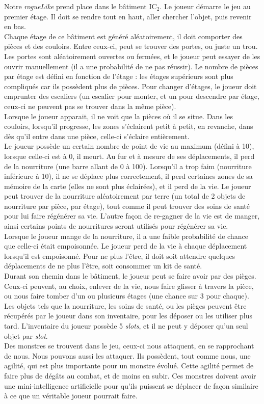 \documentclass[11pt]{report}
\begin{document}
	Notre \emph{rogueLike} prend place dans le bâtiment IC$_2$. Le joueur démarre le jeu au premier étage. Il doit se rendre tout en haut, aller chercher l'objet, puis revenir en bas.\\
	Chaque étage de ce bâtiment est généré aléatoirement, il doit comporter des pièces et des couloirs. Entre ceux-ci, peut se trouver des portes, ou juste un trou. Les portes sont aléatoirement ouvertes ou fermées, et le joueur peut essayer de les ouvrir manuellement (il a une probabilité de ne pas réussir). Le nombre de pièces par étage est défini en fonction de l'étage : les étages supérieurs sont plus compliqués car ils possèdent plus de pièces. Pour changer d'étages, le joueur doit emprunter des escaliers (un escalier pour monter, et un pour descendre par étage, ceux-ci ne peuvent pas se trouver dans la même pièce).\\
	Lorsque le joueur apparait, il ne voit que la pièces où il se situe. Dans les couloirs, lorsqu'il progresse, les zones s'éclairent petit à petit, en revanche, dans dès qu'il entre dans une pièce, celle-ci s'éclaire entièrement.\\
	Le joueur possède un certain nombre de point de vie au maximum (défini à 10), lorsque celle-ci est à 0, il meurt. Au fur et à mesure de ses déplacements, il perd de la nourriture (une barre allant de 0 à 100). Lorsqu'il a trop faim (nourriture inférieure à 10), il ne se déplace plus correctement, il perd certaines zones de sa mémoire de la carte (elles ne sont plus éclairées), et il perd de la vie. Le joueur peut trouver de la nourriture aléatoirement par terre (un total de 2 objets de nourriture par pièce, par étage), tout comme il peut trouver des soins de santé pour lui faire régénérer sa vie. L'autre façon de re-gagner de la vie est de manger, ainsi certains points de nourritures seront utilisés pour régénérer sa vie.\\
	Lorsque le joueur mange de la nourriture, il a une faible probabilité de chance que celle-ci était empoisonnée. Le joueur perd de la vie à chaque déplacement lorsqu'il est empoisonné. Pour ne plus l'être, il doit soit attendre quelques déplacements de ne plus l'être, soit consommer un kit de santé.\\
	Durant son chemin dans le bâtiment, le joueur peut se faire avoir par des pièges. Ceux-ci peuvent, au choix, enlever de la vie, nous faire glisser à travers la pièce, ou nous faire tomber d'un ou plusieurs étages (une chance sur 3 pour chaque).\\
	Les objets tels que la nourriture, les soins de santé, ou les pièges peuvent être récupérés par le joueur dans son inventaire, pour les déposer ou les utiliser plus tard. L'inventaire du joueur possède 5 \emph{slots}, et il ne peut y déposer qu'un seul objet par \emph{slot}.\\
	Des monstres se trouvent dans le jeu, ceux-ci nous attaquent, en se rapprochant de nous. Nous pouvons aussi les attaquer. Ils possèdent, tout comme nous, une agilité, qui est plus importante pour un monstre évolué. Cette agilité permet de faire plus de dégâts au combat, et de moins en subir. Ces monstres doivent avoir une mini-intelligence artificielle pour qu'ils puissent se déplacer de façon similaire à ce que un véritable joueur pourrait faire.
	
\end{document}
